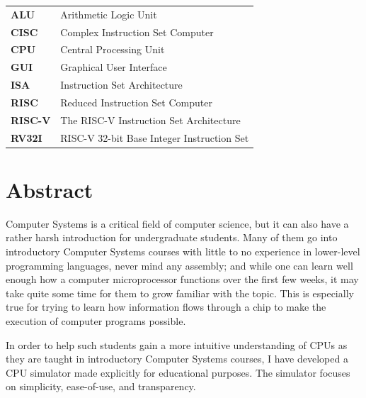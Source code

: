 \documentclass[12pt,twoside]{reedthesis}
\begin{document}
\begin{table}[h]
	\centering %
	\begin{tabular}{ll}
		\textbf{ALU}    & Arithmetic Logic Unit                      \\
		\textbf{CISC}   & Complex Instruction Set Computer           \\
		\textbf{CPU}    & Central Processing Unit                    \\
		\textbf{GUI}    & Graphical User Interface                   \\
		\textbf{ISA}    & Instruction Set Architecture               \\
		\textbf{RISC}   & Reduced Instruction Set Computer           \\
		\textbf{RISC-V} & The RISC-V Instruction Set Architecture    \\
		\textbf{RV32I}  & RISC-V 32-bit Base Integer Instruction Set \\
	\end{tabular}
\end{table}


\tableofcontents
\listoffigures

\lstlistoflistings

\chapter*{Abstract}
Computer Systems is a critical field of computer science, but it can also have a rather harsh introduction for undergraduate students. Many of them go into introductory Computer Systems courses with little to no experience in lower-level programming languages, never mind any assembly; and while one can learn well enough how a computer microprocessor functions over the first few weeks, it may take quite some time for them to grow familiar with the topic. This is especially true for trying to learn how information flows through a chip to make the execution of computer programs possible.

In order to help such students gain a more intuitive understanding of CPUs as they are taught in introductory Computer Systems courses, I have developed a CPU simulator made explicitly for educational purposes.
The simulator focuses on simplicity, ease-of-use, and transparency.
\end{document}
